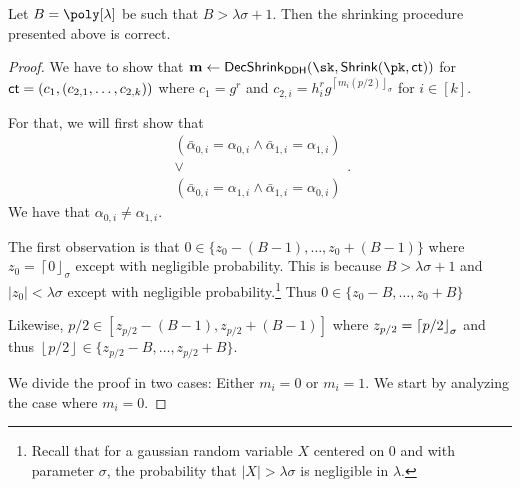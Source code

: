 \begin{lemma}[Correctness]
\label{lemma:CorrectShrinkDDH}
Let $B=\poly[\lambda]$ be such that $B>\lambda\sigma+1$. Then the shrinking procedure presented above is correct.
\end{lemma}
\begin{proof}
We have to show that $\mn\leftarrow\mathsf{DecShrink}_\mathsf{DDH}(\sk,\mathsf{Shrink}(\pk,\ct))$ for $\mathsf{ct}=(c_1,(c_{2,1},\dots,c_{2,k}))$ where $c_1=g^r$ and $c_{2,i}=h_i^rg^{\left\lceil m_i(p/2)\right\rfloor_\sigma}$ for $i\in[k]$.

For that, we will first show that 
$$\begin{array}{c}
    ( \bar \alpha_{0,i}=\alpha_{0,i} \land \bar \alpha_{1,i}=\alpha_{1,i} ) \\
    \lor  \\
   ( \bar \alpha_{0,i}=\alpha_{1,i} \land \bar \alpha_{1,i}=\alpha_{0,i})
\end{array}.$$ We have that $\alpha_{0,i}\neq \alpha_{1,i}$.


The first observation is that $0\in \{ z_0- (B-1) , \dots, z_0+ (B-1) \}$ where $z_0=\left\lceil 0\right\rfloor_\sigma$ except with negligible probability. This is because $B>\lambda\sigma+1$ and $|z_0|<\lambda\sigma$ except with negligible probability.\footnote{Recall that for a gaussian random variable $X$ centered on $0$ and with parameter $\sigma$, the probability that $|X|>\lambda\sigma$ is negligible in $\lambda$.} Thus $0\in \{ z_0- B , \dots, z_0+ B \}$ 

Likewise,  $p/2\in\left[z_{p/2}-(B-1),z_{p/2}+(B-1)\right]$ where $z_{p/2}=\left\lceil p/2 \right\rfloor_{\sigma}$ and thus  $\left\lfloor p/2\right\rfloor\in \{ z_{p/2}- B , \dots, z_{p/2}+ B \}$.%

We divide the proof in two cases: Either $m_i=0$ or $m_i=1$. We start by analyzing the case where $m_i=0$.


\end{proof}
